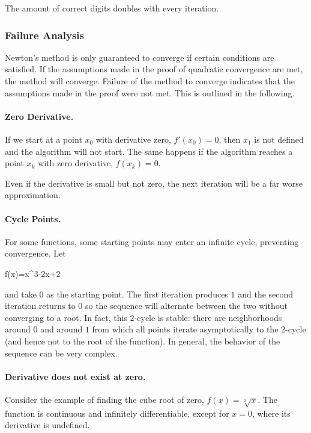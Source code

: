 \vspace*{3mm}

The amount of correct digits doubles with every iteration.

\subsubsection{Failure Analysis}

Newton's method is only guaranteed to converge if certain conditions are satisfied. If the assumptions made in the proof of quadratic convergence are met, the method will converge. Failure of the method to converge indicates that the assumptions made in the proof were not met. This is outlined in the following.

\paragraph{Zero Derivative.} If we start at a point $x_0$ with derivative zero, $f'(x_0) = 0$, then $x_1$ is not defined and the algorithm will not start. The same happens if the algorithm reaches a point $x_k$ with zero derivative, $f(x_k) = 0$.

Even if the derivative is small but not zero, the next iteration will be a far worse approximation.

\paragraph{Cycle Points.} For some functions, some starting points may enter an infinite cycle, preventing convergence. Let

\bee
f(x)=x^{3}-2x+2
\eee

and take $0$ as the starting point. The first iteration produces $1$ and the second iteration returns to $0$ so the sequence will alternate between the two without converging to a root. In fact, this $2$-cycle is stable: there are neighborhoods around $0$ and around $1$ from which all points iterate asymptotically to the $2$-cycle (and hence not to the root of the function). In general, the behavior of the sequence can be very complex.

\paragraph{Derivative does not exist at zero.} Consider the example of finding the cube root of zero, $f(x)={\sqrt[{3}]{x}}$. The function is continuous and infinitely differentiable, except for $x = 0$, where its derivative is undefined.

